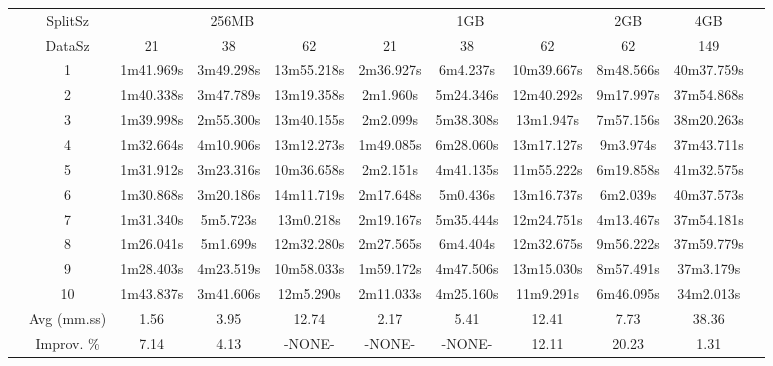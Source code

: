 \begin{tabularx}{\linewidth}{c|c|c|c|c|c|c|c|c|c|l|}
\cline{2-10}
& SplitSz 
& \multicolumn{3}{c|}{256MB} & \multicolumn{3}{c|}{1GB}  & \multicolumn{1}{c|}{2GB} & \multicolumn{1}{c|}{4GB} \\
\cline{2-10}
& DataSz 
& 21 & 38 & 62 & 21 & 38 & 62 & 62 & 149 \\
\cline{2-10}
& 1
& 1m41.969s & 3m49.298s & 13m55.218s & 2m36.927s & 6m4.237s & 10m39.667s & 8m48.566s & 40m37.759s \\
\cline{2-10}
& 2
& 1m40.338s & 3m47.789s & 13m19.358s & 2m1.960s & 5m24.346s & 12m40.292s & 9m17.997s & 37m54.868s \\
\cline{2-10}
& 3
& 1m39.998s & 2m55.300s & 13m40.155s & 2m2.099s & 5m38.308s & 13m1.947s & 7m57.156s & 38m20.263s \\
\cline{2-10}
& 4
& 1m32.664s & 4m10.906s & 13m12.273s & 1m49.085s & 6m28.060s & 13m17.127s & 9m3.974s & 37m43.711s \\
\cline{2-10}
& 5
& 1m31.912s & 3m23.316s & 10m36.658s & 2m2.151s & 4m41.135s & 11m55.222s & 6m19.858s & 41m32.575s \\
\cline{2-10}
& 6
& 1m30.868s & 3m20.186s & 14m11.719s & 2m17.648s & 5m0.436s & 13m16.737s & 6m2.039s & 40m37.573s \\
\cline{2-10}
& 7
&  1m31.340s & 5m5.723s & 13m0.218s & 2m19.167s & 5m35.444s & 12m24.751s & 4m13.467s & 37m54.181s \\
\cline{2-10}
& 8
& 1m26.041s & 5m1.699s & 12m32.280s & 2m27.565s & 6m4.404s & 12m32.675s & 9m56.222s & 37m59.779s \\
\cline{2-10}
& 9
& 1m28.403s & 4m23.519s & 10m58.033s & 1m59.172s & 4m47.506s & 13m15.030s & 8m57.491s & 37m3.179s \\
\cline{2-10}
& 10
& 1m43.837s & 3m41.606s & 12m5.290s & 2m11.033s & 4m25.160s & 11m9.291s & 6m46.095s & 34m2.013s \\
\cline{2-10}
& Avg (mm.ss)
& 1.56 & 3.95 & 12.74 & 2.17 & 5.41 & 12.41 & 7.73 & 38.36 \\
\cline{2-10}
& Improv. \%
& 7.14 & 4.13 & -NONE- & -NONE- & -NONE- & 12.11 & 20.23 & 1.31 \\
\cline{2-10}
\end{tabularx}
